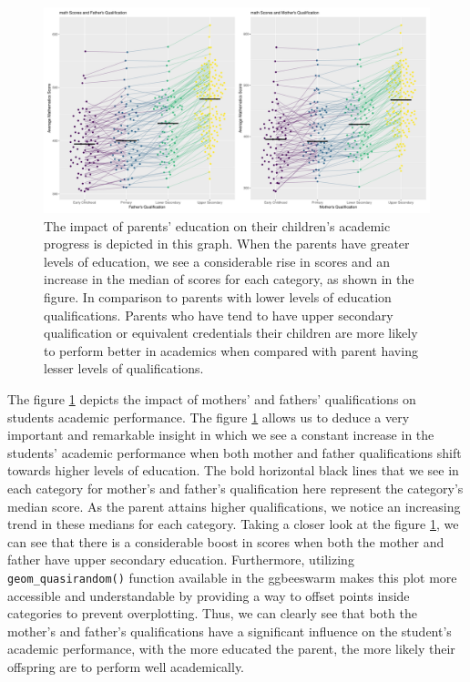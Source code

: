 \begin{Schunk}
\begin{figure}[H]
\includegraphics[width=1\linewidth]{learningtower_files/figure-latex/qual-plot-1} \caption[The impact of parents' education on their children's academic progress is depicted in this graph]{The impact of parents' education on their children's academic progress is depicted in this graph. When the parents have greater levels of education, we see a considerable rise in scores and an increase in the median of scores for each category, as shown in the figure. In comparison to parents with lower levels of education qualifications. Parents who have tend to have upper secondary qualification or equivalent credentials their children are more likely to perform better in academics when compared with parent having lesser levels of qualifications.}\label{fig:qual-plot}
\end{figure}
\end{Schunk}

The figure \ref{fig:qual-plot} depicts the impact of mothers' and
fathers' qualifications on students academic performance. The figure
\ref{fig:qual-plot} allows us to deduce a very important and remarkable
insight in which we see a constant increase in the students' academic
performance when both mother and father qualifications shift towards
higher levels of education. The bold horizontal black lines that we see
in each category for mother's and father's qualification here represent
the category's median score. As the parent attains higher
qualifications, we notice an increasing trend in these medians for each
category. Taking a closer look at the figure \ref{fig:qual-plot}, we can
see that there is a considerable boost in scores when both the mother
and father have upper secondary education. Furthermore, utilizing
\texttt{geom\_quasirandom()} function available in the
 \citep{ggbeeswarm} ggbeeswarm makes this plot more
accessible and understandable by providing a way to offset points inside
categories to prevent overplotting. Thus, we can clearly see that both
the mother's and father's qualifications have a significant influence on
the student's academic performance, with the more educated the parent,
the more likely their offspring are to perform well academically.

